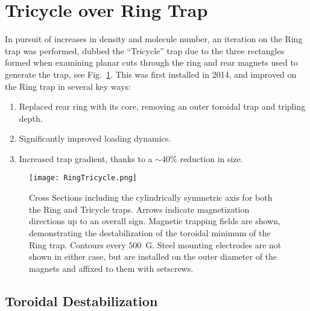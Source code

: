 \section{Tricycle over Ring Trap}

In pursuit of increases in density and molecule number, an iteration on the Ring trap was performed, dubbed the ``Tricycle'' trap due to the three rectangles formed when examining planar cuts through the ring and rear magnets used to generate the trap, see Fig.~\ref{ringtricyclefigure}.
This was first installed in 2014, and improved on the Ring trap in several key ways:
\begin{enumerate}
\item Replaced rear ring with its core, removing an outer toroidal trap and tripling depth.
\item Significantly improved loading dynamics.
\item Increased trap gradient, thanks to a $\sim 40\%$ reduction in size.
\end{enumerate}

\begin{figure}[t!]
\texttt{[image: RingTricycle.png]}
\caption[Ring and Tricycle Trap Comparison]{\label{ringtricyclefigure}
Cross Sections including the cylindrically symmetric axis for both the Ring and Tricycle traps. Arrows indicate magnetization directions up to an overall sign. Magnetic trapping fields are shown, demonstrating the destabilization of the toroidal minimum of the Ring trap. Contours every $500$~G. Steel mounting electrodes are not shown in either case, but are installed on the outer diameter of the magnets and affixed to them with setscrews.
}
\end{figure}

\subsection{Toroidal Destabilization}

